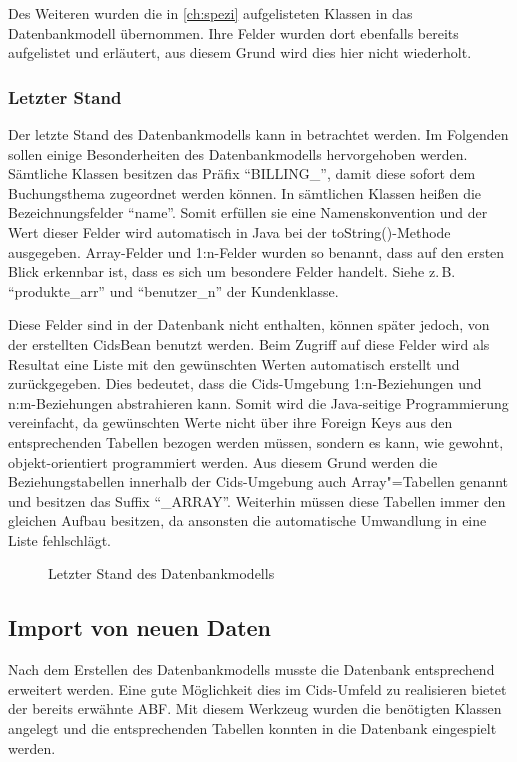 Des Weiteren wurden die in \autoref{ch:spezi} aufgelisteten Klassen in das Datenbankmodell übernommen. Ihre Felder wurden dort ebenfalls bereits aufgelistet und erläutert, aus diesem Grund wird dies hier nicht wiederholt.

\subsubsection{Letzter Stand}
Der letzte Stand des Datenbankmodells kann in  betrachtet werden.
Im Folgenden sollen einige Besonderheiten des Datenbankmodells hervorgehoben werden.
Sämtliche Klassen besitzen das Präfix "`BILLING\_"', damit diese sofort dem Buchungsthema zugeordnet werden können.
In sämtlichen Klassen heißen die Bezeichnungsfelder "`name"'.
Somit erfüllen sie eine Namenskonvention und der Wert dieser Felder wird automatisch in Java bei der toString()-Methode ausgegeben.
Array-Felder und 1:n-Felder wurden so benannt, dass auf den ersten Blick erkennbar ist, dass es sich um besondere Felder handelt.
Siehe z.\,B. "`produkte\_arr"' und "`benutzer\_n"' der Kundenklasse.

Diese Felder sind in der Datenbank nicht enthalten, können später jedoch, von der erstellten CidsBean benutzt werden.
Beim Zugriff auf diese Felder wird als Resultat eine Liste mit den gewünschten Werten automatisch erstellt und zurückgegeben.
Dies bedeutet, dass die Cids-Umgebung 1:n-Beziehungen und n:m-Beziehungen abstrahieren kann.
Somit wird die Java-seitige Programmierung vereinfacht, da gewünschten Werte nicht über ihre Foreign Keys aus den entsprechenden Tabellen bezogen werden müssen, sondern es kann, wie gewohnt, objekt-orientiert programmiert werden.
Aus diesem Grund werden die Beziehungstabellen innerhalb der Cids-Umgebung auch Array"=Tabellen genannt und besitzen das Suffix "`\_ARRAY"'.
Weiterhin müssen diese Tabellen immer den gleichen Aufbau besitzen, da ansonsten die automatische Umwandlung in eine Liste fehlschlägt.

\begin{sidewaysfigure}
	\centering
	\caption{Letzter Stand des Datenbankmodells}
	\label{fig:db-final}
\end{sidewaysfigure}

\subsection{Import von neuen Daten}
Nach dem Erstellen des Datenbankmodells musste die Datenbank entsprechend erweitert werden.
Eine gute Möglichkeit dies im Cids-Umfeld zu realisieren bietet der bereits erwähnte \ac{ABF}. Mit diesem Werkzeug wurden die benötigten Klassen angelegt und die entsprechenden Tabellen konnten in die Datenbank eingespielt werden.

